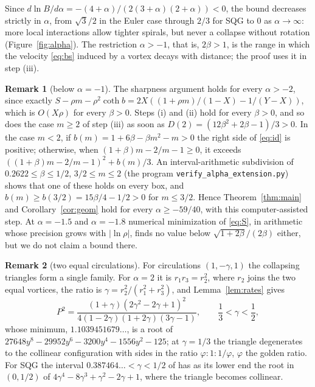 \documentclass[11pt]{article}
\theoremstyle{definition}
\newtheorem{remark}{Remark}
\begin{document}
Since $d\ln B/d\alpha = -(4 + \alpha)/(2(3 + \alpha)(2 + \alpha)) < 0$, the bound decreases strictly in $\alpha$, from $\sqrt3/2$ in the Euler case through $2/3$ for SQG to $0$ as $\alpha \to \infty$: more local interactions allow tighter spirals, but never a collapse without rotation (Figure~\ref{fig:alpha}). The restriction $\alpha > -1$, that is, $2\beta > 1$, is the range in which the velocity \eqref{eq:bs} induced by a vortex decays with distance; the proof uses it in step (iii).

\begin{remark}[below $\alpha = -1$]\label{rem:below}
The sharpness argument holds for every $\alpha > -2$, since exactly $S - \rho m - \rho^2\coth b = 2X((1 + \rho m)/(1 - X) - 1/(Y - X))$, which is $O(X\rho)$ for every $\beta > 0$. Steps (i) and (ii) hold for every $\beta > 0$, and so does the case $m \ge 2$ of step (iii) as soon as $D(2) = (12\beta^2 + 2\beta - 1)/3 > 0$. In the case $m < 2$, if $b(m) = 1 + 6\beta - \beta m^2 - m > 0$ the right side of \eqref{eq:id} is positive; otherwise, when $(1 + \beta)m - 2/m - 1 \ge 0$, it exceeds $((1 + \beta)m - 2/m - 1)^2 + b(m)/3$. An interval-arithmetic subdivision of $0.2622 \le \beta \le 1/2$, $3/2 \le m \le 2$ (the program \texttt{verify\_alpha\_extension.py}) shows that one of these holds on every box, and $b(m) \ge b(3/2) = 15\beta/4 - 1/2 > 0$ for $m \le 3/2$. Hence Theorem~\ref{thm:main} and Corollary~\ref{cor:geom} hold for every $\alpha \ge -59/40$, with this computer-assisted step. At $\alpha = -1.5$ and $\alpha = -1.8$ numerical minimization of \eqref{eq:S}, in arithmetic whose precision grows with $|\ln\rho|$, finds no value below $\sqrt{1 + 2\beta}/(2\beta)$ either, but we do not claim a bound there.
\end{remark}

\begin{remark}[two equal circulations]\label{rem:equal}
For circulations $(1, -\gamma, 1)$ the collapsing triangles form a single family. For $\alpha = 2$ it is $r_1 r_3 = r_2^2$, where $r_2$ joins the two equal vortices, the ratio is $\gamma = r_2^2/(r_1^2 + r_3^2)$, and Lemma~\ref{lem:rates} gives
\[
P^2 = \frac{(1 + \gamma)(2\gamma^2 - 2\gamma + 1)^2}{4(1 - 2\gamma)(1 + 2\gamma)(3\gamma - 1)}, \qquad \frac13 < \gamma < \frac12,
\]
whose minimum, $1.1039451679\ldots$, is a root of $27648y^8 - 29952y^6 - 3200y^4 - 1556y^2 - 125$; at $\gamma = 1/3$ the triangle degenerates to the collinear configuration with sides in the ratio $\varphi : 1 : 1/\varphi$, $\varphi$ the golden ratio. For SQG the interval $0.387464\ldots < \gamma < 1/2$ of \cite{bb2018,cl2024} has as its lower end the root in $(0, 1/2)$ of $4\gamma^4 - 8\gamma^3 + \gamma^2 - 2\gamma + 1$, where the triangle becomes collinear.
\end{remark}
\end{document}
